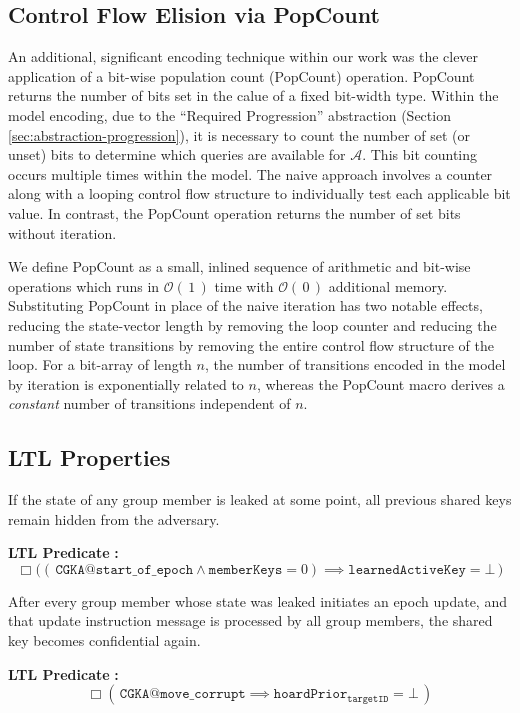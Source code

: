 \documentclass[runningheads]{llncs}
\newcommand{\Adversary}{\ensuremath{\mathcal{A}}\xspace}
\newcommand{\BigO}[1]{\ensuremath{\mathcal{O}\left(\,#1\,\right)}\xspace}
\begin{document}
\subsection{Control Flow Elision via PopCount\label{sec:popcount}}

An additional, significant \Promela encoding technique within our work was the clever application of a bit-wise population count (PopCount) operation.
PopCount returns the number of bits set in the calue of a fixed bit-width type.
Within the model encoding, due to the ``Required Progression''  abstraction (Section \ref{sec:abstraction-progression}), it is necessary to count the number of set (or unset) bits to determine which queries are available for \Adversary.
This bit counting occurs multiple times within the model.
The naive approach involves a counter along with a looping control flow structure to individually test each applicable bit value.
In contrast, the PopCount operation returns the number of set bits without iteration.

We define PopCount as a small, inlined sequence of arithmetic and bit-wise operations which runs in \BigO{1} time with \BigO{0} additional memory.
Substituting PopCount in place of the naive iteration has two notable effects, reducing the state-vector length by removing the loop counter and reducing the number of state transitions by removing the entire control flow structure of the loop.
For a bit-array of length $n$, the number of transitions encoded in the model by iteration is exponentially related to $n$, whereas the PopCount macro derives a \emph{constant} number of transitions independent of $n$.

\subsection{LTL Properties}

\begin{definition}
If the state of any group member is leaked at some point, all previous shared keys remain hidden from the adversary.
\end{definition}%
\noindent\textbf{LTL Predicate} \textbf{:}%
\[%
\Box \Big( \left(\, \texttt{CGKA@start\_of\_epoch} \land \texttt{memberKeys} = 0\right) \implies \texttt{learnedActiveKey} = \bot \, \Big)%
\]%

\begin{definition}
After every group member whose state was leaked initiates an epoch update, and that update instruction message is processed by all group members, the shared key becomes confidential again.
\end{definition}%
\noindent\textbf{LTL Predicate} \textbf{:}%
\[%
\Box \left(\, \texttt{CGKA@move\_corrupt} \implies \texttt{hoardPrior}_{\texttt{targetID}} = \bot \,\right)%
\]%
\end{document}
